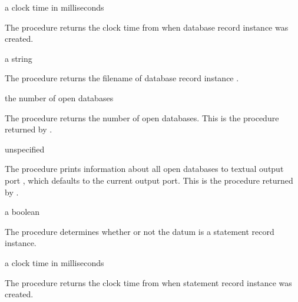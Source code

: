 \begin{procedure}
\end{procedure}
\returns{} a clock time in milliseconds

The  procedure returns the clock time from
 when database record instance  was created.

\begin{procedure}
\end{procedure}
\returns{} a string

The  procedure returns the filename of
database record instance .

\begin{procedure}
\end{procedure}
\returns{} the number of open databases

The  procedure returns the number of open
databases.
This is the procedure returned by .

\begin{procedure}
\end{procedure}
\returns{} unspecified

The  procedure prints information about all open
databases to textual output port , which defaults to the
current output port.
This is the procedure returned by .

\begin{procedure}
\end{procedure}
\returns{} a boolean

The  procedure determines whether or not the datum
 is a statement record instance.

\begin{procedure}
\end{procedure}
\returns{} a clock time in milliseconds

The  procedure returns the clock time from
 when statement record instance  was
created.

